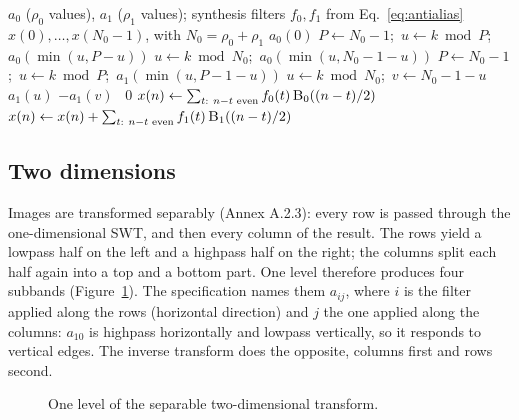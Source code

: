 \begin{algorithm}[ht]
  \caption{One-dimensional symmetric wavelet synthesis.}
  \label{alg:synthesis}
  \begin{algorithmic}[1]
    \Require $a_0$ ($\rho_0$ values), $a_1$ ($\rho_1$ values); synthesis filters $f_0, f_1$ from Eq.~\eqref{eq:antialias}
    \Ensure $x(0),\dots,x(N_0-1)$, with $N_0 = \rho_0 + \rho_1$
        \Return $a_0(0)$ \EndIf
        \State $P \gets N_0 - 1$;\ $u \gets k \bmod P$;\ \Return $a_0(\min(u, P-u))$
      \Else \State $u \gets k \bmod N_0$;\ \Return $a_0(\min(u, N_0-1-u))$
      \EndIf
    \EndFunction
       \State $P \gets N_0 - 1$;\ $u \gets k \bmod P$;\ \Return $a_1(\min(u, P-1-u))$
      \Else \State $u \gets k \bmod N_0$;\ $v \gets N_0-1-u$
         \Return $a_1(u)$  \Return $-a_1(v)$ \Else\ \Return $0$ \EndIf
      \EndIf
    \EndFunction
      \State $x(n) \gets \sum_{t:\ n-t \text{ even}} f_0(t)\,\Call{B$_0$}{(n-t)/2}$
      \State $x(n) \gets x(n) + \sum_{t:\ n-t \text{ even}} f_1(t)\,\Call{B$_1$}{(n-t)/2}$ 
    \EndFor
  \end{algorithmic}
\end{algorithm}

\subsection{Two dimensions}

Images are transformed separably (Annex A.2.3): every row is passed through the
one-dimensional SWT, and then every column of the result. The rows yield a lowpass half on
the left and a highpass half on the right; the columns split each half again into a top and a
bottom part. One level therefore produces four subbands (Figure~\ref{fig:twodim}). The
specification names them $a_{ij}$, where $i$ is the filter applied along the rows (horizontal
direction) and $j$ the one applied along the columns: $a_{10}$ is highpass horizontally and
lowpass vertically, so it responds to vertical edges. The inverse transform does the opposite,
columns first and rows second.

\begin{figure}[ht]
  \centering
  
  \caption{One level of the separable two-dimensional transform.}
  \label{fig:twodim}
\end{figure}

